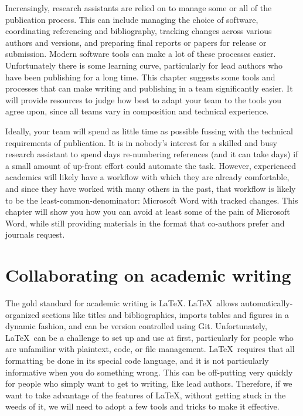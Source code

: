 
\begin{fullwidth}
Increasingly, research assistants are relied on to manage some or all
of the publication process. This can include
managing the choice of software,
coordinating referencing and bibliography,
tracking changes across various authors and versions,
and preparing final reports or papers for release or submission.
Modern software tools can make a lot of these processes easier.
Unfortunately there is some learning curve,
particularly for lead authors who have been publishing for a long time.
This chapter suggests some tools and processes
that can make writing and publishing in a team significantly easier.
It will provide resources
to judge how best to adapt your team to the tools you agree upon,
since all teams vary in composition and technical experience.

Ideally, your team will spend as little time as possible
fussing with the technical requirements of publication.
It is in nobody's interest for a skilled and busy research assistant
to spend days re-numbering references (and it can take days)
if a small amount of up-front effort could automate the task.
However, experienced academics will likely have a workflow
with which they are already comfortable,
and since they have worked with many others in the past,
that workflow is likely to be the least-common-denominator:
Microsoft Word with tracked changes.
This chapter will show you how you can avoid at least some
of the pain of Microsoft Word,
while still providing materials in the format
that co-authors prefer and journals request.
\end{fullwidth}


\section{Collaborating on academic writing}

The gold standard for academic writing is \LaTeX.
\index{\LaTeX}
\LaTeX\ allows automatically-organized sections like titles and bibliographies,
imports tables and figures in a dynamic fashion,
and can be version controlled using Git.
Unfortunately, \LaTeX\ can be a challenge to set up and use at first,
particularly for people who are unfamiliar with plaintext, code, or file management.
\LaTeX\ requires that all formatting be done in its special code language,
and it is not particularly informative when you do something wrong.
This can be off-putting very quickly for people
who simply want to get to writing, like lead authors.
Therefore, if we want to take advantage of the features of \LaTeX,
without getting stuck in the weeds of it,
we will need to adopt a few tools and tricks to make it effective.


